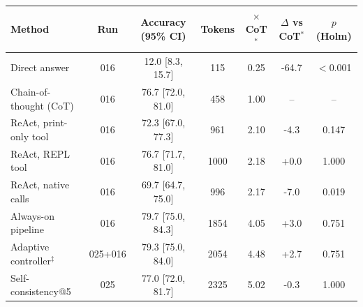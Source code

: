 \begin{tabular}{lcccccc}
\toprule
Method & Run & Accuracy (95\% CI) & Tokens & $\times$CoT$^\ast$ & $\Delta$ vs CoT$^\ast$ & $p$ (Holm) \\
\midrule
Direct answer & 016 & 12.0 [8.3, 15.7] & 115 & 0.25 & -64.7 & $<$0.001 \\
Chain-of-thought (CoT) & 016 & 76.7 [72.0, 81.0] & 458 & 1.00 & -- & -- \\
ReAct, print-only tool & 016 & 72.3 [67.0, 77.3] & 961 & 2.10 & -4.3 & 0.147 \\
ReAct, REPL tool & 016 & 76.7 [71.7, 81.0] & 1000 & 2.18 & +0.0 & 1.000 \\
ReAct, native calls & 016 & 69.7 [64.7, 75.0] & 996 & 2.17 & -7.0 & 0.019 \\
Always-on pipeline & 016 & 79.7 [75.0, 84.3] & 1854 & 4.05 & +3.0 & 0.751 \\
Adaptive controller$^\ddagger$ & 025+016 & 79.3 [75.0, 84.0] & 2054 & 4.48 & +2.7 & 0.751 \\
Self-consistency@5 & 025 & 77.0 [72.0, 81.7] & 2325 & 5.02 & -0.3 & 1.000 \\
\bottomrule
\end{tabular}
